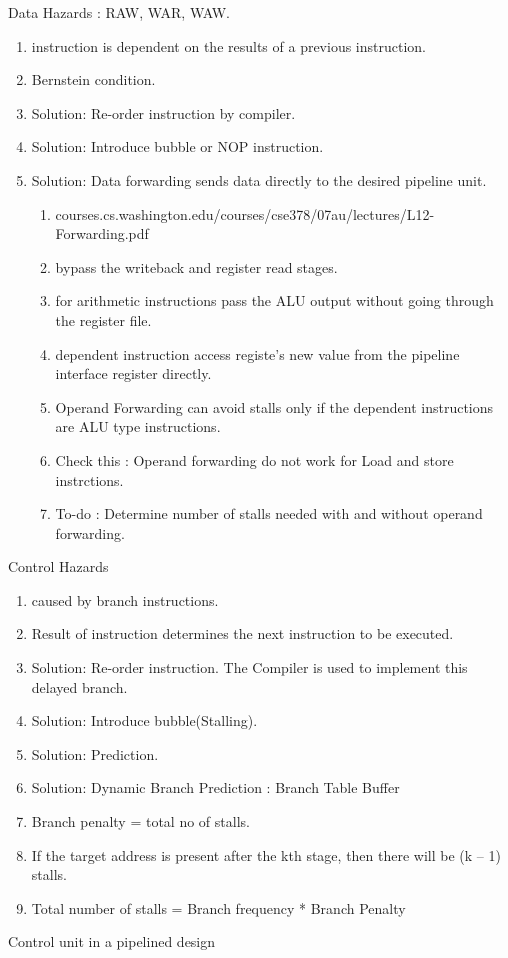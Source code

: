 \begin{enumerate}
\begin{minipage}{\linewidth}
    \item Data Hazards : RAW, WAR, WAW.
    \begin{enumerate}
        \item instruction is dependent on the results of a previous instruction.
        \item Bernstein condition.
        \item Solution: Re-order instruction by compiler.
        \item Solution: Introduce bubble or NOP instruction.
        \item Solution: Data forwarding sends data directly to the desired pipeline unit.
        \begin{enumerate}
            \item courses.cs.washington.edu/courses/cse378/07au/lectures/L12-Forwarding.pdf
            \item bypass the writeback and register read stages.
            \item for arithmetic instructions pass the ALU output without going through the register file.
            \item dependent instruction access registe's new value from the pipeline interface register directly.
            \item Operand Forwarding can avoid stalls only if the dependent instructions are ALU type instructions.
            \item Check this : Operand forwarding do not work for Load and store instrctions.
            \item To-do : Determine number of stalls needed with and without operand forwarding.
        \end{enumerate}
    \end{enumerate}

    \item Control Hazards
    \begin{enumerate}
        \item caused by branch instructions.
        \item Result of instruction determines the next instruction to be executed.
        \item Solution: Re-order instruction. The Compiler is used to implement this delayed branch.
        \item Solution: Introduce bubble(Stalling).
        \item Solution: Prediction.
        \item Solution: Dynamic Branch Prediction : Branch Table Buffer
        \item Branch penalty = total no of stalls.
        \item If the target address is present after the kth stage, then there will be (k – 1) stalls.
        \item Total number of stalls = Branch frequency * Branch Penalty
    \end{enumerate}
    \end{minipage}

    \item  Control unit in a pipelined design

\end{enumerate}
